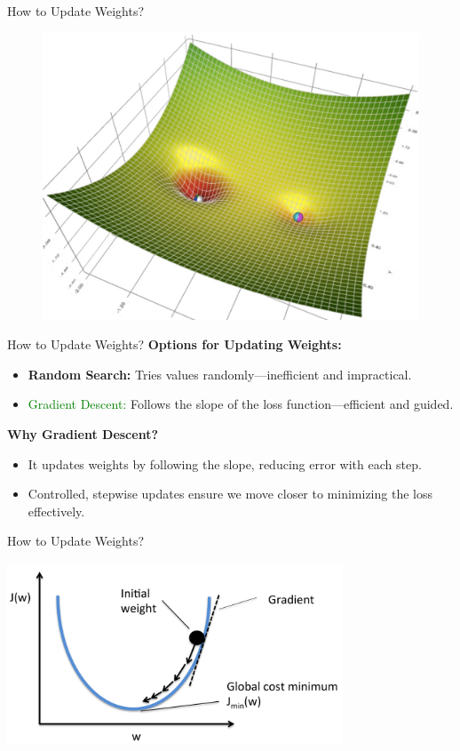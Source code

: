 \documentclass[serif, aspectratio=169]{beamer}
\begin{document}
\begin{frame}{How to Update Weights?}
\begin{figure}[!htb]
\begin{minipage}{0.3\textwidth}
  \end{minipage}\hfill
  \begin{minipage}{0.3\textwidth}
     \centering
     \includegraphics[width=.9\linewidth]{pic/gd3.png}
  \end{minipage}
\end{figure}
\end{frame}

\begin{frame}{How to Update Weights?}
 \textbf{Options for Updating Weights:}
    \begin{itemize}
        \item \textbf{Random Search:} Tries values randomly—inefficient and impractical.
        \item \textcolor{green}{Gradient Descent:} Follows the slope of the loss function—efficient and guided.
    \end{itemize}
    
    \textbf{Why Gradient Descent?}
    \begin{itemize}
        \item It updates weights by following the slope, reducing error with each step.
        \item Controlled, stepwise updates ensure we move closer to minimizing the loss effectively.
    \end{itemize}
\end{frame}

\begin{frame}{How to Update Weights?}

    
    \begin{center}
        \includegraphics[width=10cm]{pic/ball.png}  
    \end{center}
\end{frame}
\end{document}
